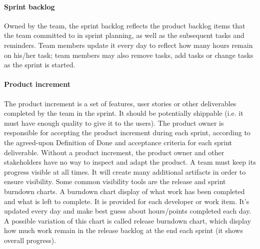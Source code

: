 \documentclass[11pt]{article}
\begin{document}
\paragraph{Sprint backlog} Owned by the team, the sprint backlog reflects the product backlog items that the team committed to in sprint planning, as well as the subsequent tasks and reminders. Team members update it every day to reflect how many hours remain on his/her task; team members may also remove tasks, add tasks or change tasks as the sprint is started.
\paragraph{Product increment} The product increment is a set of features, user stories or other deliverables completed by the team in the sprint. It should be potentially shippable (i.e. it must have enough quality to give it to the users). The product owner is responsible for accepting the product increment during each sprint, according to the agreed-upon Definition of Done and acceptance criteria for each sprint deliverable. Without a product increment, the product owner and other stakeholders have no way to inspect and adapt the product. A team must keep its progress visible at all times. It will create many additional artifacts in order to ensure visibility. Some common visibility tools are the release and sprint burndown charts. A burndown chart display of what work has been completed and what is left to complete. It is provided for each developer or work item. It's updated every day and make best guess about hours/points completed each day. A possible variation of this chart is called release burndown chart, which display how much work remain in the release backlog at the end each sprint (it shows overall progress).
\end{document}
